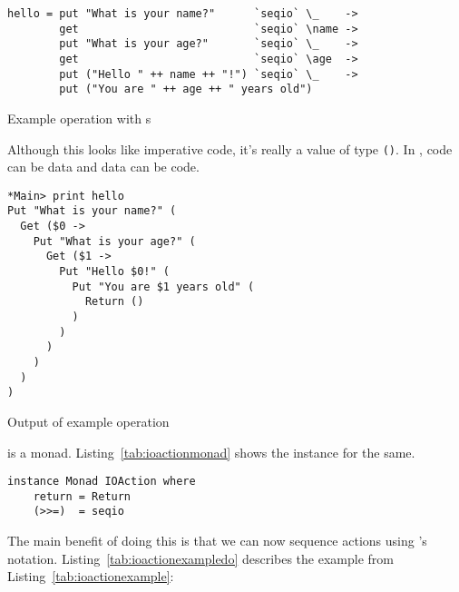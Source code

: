 \documentclass[thesis-solanki.tex]{subfiles}
\begin{document}
\begin{code-list}
\begin{singlespace}
\begin{verbatim}
hello = put "What is your name?"      `seqio` \_    ->
        get                           `seqio` \name ->
        put "What is your age?"       `seqio` \_    ->
        get                           `seqio` \age  ->
        put ("Hello " ++ name ++ "!") `seqio` \_    ->
        put ("You are " ++ age ++ " years old")
\end{verbatim}
\end{singlespace}
\caption{Example operation with s}
\label{tab:ioactionexample}
\end{code-list}

Although this looks like imperative code, it's really a value of type  \Verb!()!. In ,
code can be data and data can be code.

\begin{code-list}[H]
\begin{singlespace}
\begin{verbatim}
*Main> print hello
Put "What is your name?" (
  Get ($0 -> 
    Put "What is your age?" (
      Get ($1 -> 
        Put "Hello $0!" (
          Put "You are $1 years old" (
            Return ()
          )
        )
      )
    )
  )
)
\end{verbatim}
\end{singlespace}
\caption{Output of example operation}
\label{tab:ioactionexampleoutput}
\end{code-list}

 is a monad. Listing~\ref{tab:ioactionmonad} shows the instance for the same.

\begin{code-list}[H]
\begin{singlespace}
\begin{verbatim}
instance Monad IOAction where
    return = Return
    (>>=)  = seqio
\end{verbatim}
\end{singlespace}
\caption{}
\label{tab:ioactionmonad}
\end{code-list}



The main benefit of doing this is that we can now sequence actions using 's
 notation. Listing~\ref{tab:ioactionexampledo} describes the example from Listing~\ref{tab:ioactionexample}:
\end{document}

